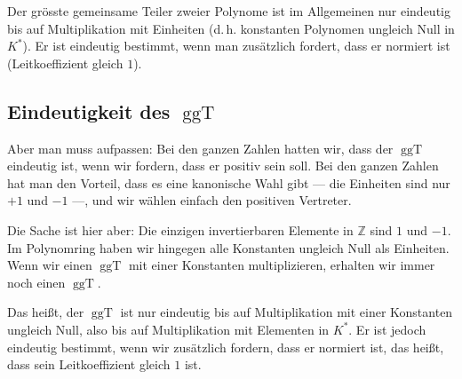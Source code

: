 \begin{math-stroke}

\begin{remark}
Der grösste gemeinsame Teiler zweier Polynome ist im Allgemeinen nur eindeutig bis auf Multiplikation mit Einheiten (d.\,h. konstanten Polynomen ungleich Null in $K^*$). Er ist eindeutig bestimmt, wenn man zusätzlich fordert, dass er normiert ist (Leitkoeffizient gleich $1$).
\end{remark}
\end{math-stroke}

\subsection{Eindeutigkeit des \texorpdfstring{$\operatorname{ggT}$}{ggT}}

\begin{spoken-clean}[00:28:47 - 00:30:06]
Aber man muss aufpassen: Bei den ganzen Zahlen hatten wir, dass der $\operatorname{ggT}$ eindeutig ist, wenn wir fordern, dass er positiv sein soll. Bei den ganzen Zahlen hat man den Vorteil, dass es eine kanonische Wahl gibt --- die Einheiten sind nur $+1$ und $-1$ ---, und wir wählen einfach den positiven Vertreter.

Die Sache ist hier aber: Die einzigen invertierbaren Elemente in $\mathbb{Z}$ sind $1$ und $-1$. Im Polynomring haben wir hingegen alle Konstanten ungleich Null als Einheiten. Wenn wir einen $\operatorname{ggT}$ mit einer Konstanten multiplizieren, erhalten wir immer noch einen $\operatorname{ggT}$.

Das heißt, der $\operatorname{ggT}$ ist nur eindeutig bis auf Multiplikation mit einer Konstanten ungleich Null, also bis auf Multiplikation mit Elementen in $K^*$. Er ist jedoch eindeutig bestimmt, wenn wir zusätzlich fordern, dass er normiert ist, das heißt, dass sein Leitkoeffizient gleich $1$ ist.
\end{spoken-clean}

